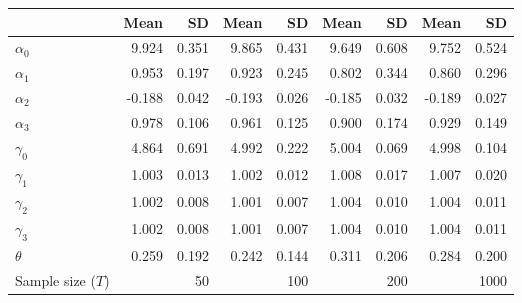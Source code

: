 
\begin{tabular}[t]{lrrrrrrrr}
\toprule
  & Mean & SD & Mean  & SD  & Mean   & SD   & Mean    & SD   \\
\midrule
$\alpha_{0}$ & 9.924 & 0.351 & 9.865 & 0.431 & 9.649 & 0.608 & 9.752 & 0.524\\
$\alpha_{1}$ & 0.953 & 0.197 & 0.923 & 0.245 & 0.802 & 0.344 & 0.860 & 0.296\\
$\alpha_{2}$ & -0.188 & 0.042 & -0.193 & 0.026 & -0.185 & 0.032 & -0.189 & 0.027\\
$\alpha_{3}$ & 0.978 & 0.106 & 0.961 & 0.125 & 0.900 & 0.174 & 0.929 & 0.149\\
$\gamma_{0}$ & 4.864 & 0.691 & 4.992 & 0.222 & 5.004 & 0.069 & 4.998 & 0.104\\
$\gamma_{1}$ & 1.003 & 0.013 & 1.002 & 0.012 & 1.008 & 0.017 & 1.007 & 0.020\\
$\gamma_{2}$ & 1.002 & 0.008 & 1.001 & 0.007 & 1.004 & 0.010 & 1.004 & 0.011\\
$\gamma_{3}$ & 1.002 & 0.008 & 1.001 & 0.007 & 1.004 & 0.010 & 1.004 & 0.011\\
$\theta$ & 0.259 & 0.192 & 0.242 & 0.144 & 0.311 & 0.206 & 0.284 & 0.200\\
Sample size ($T$) &  & 50 &  & 100 &  & 200 &  & 1000\\
\bottomrule
\end{tabular}
